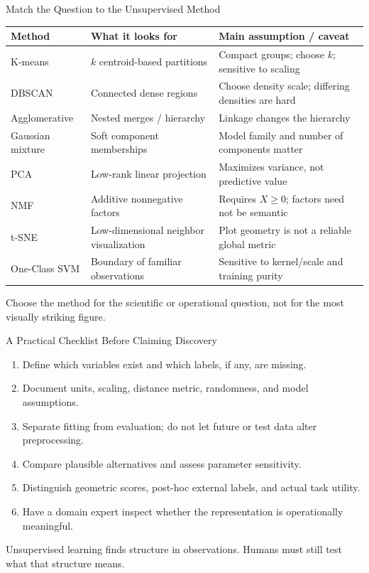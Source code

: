 \documentclass[aspectratio=169,10pt]{beamer}
\begin{document}
\begin{frame}{Match the Question to the Unsupervised Method}
\footnotesize
\begin{tabular}{@{}p{.22\linewidth}p{.31\linewidth}p{.39\linewidth}@{}}
\textbf{Method} & \textbf{What it looks for} & \textbf{Main assumption / caveat}\\[2pt]\hline
K-means & $k$ centroid-based partitions & Compact groups; choose $k$; sensitive to scaling\\[2pt]
DBSCAN & Connected dense regions & Choose density scale; differing densities are hard\\[2pt]
Agglomerative & Nested merges / hierarchy & Linkage changes the hierarchy\\[2pt]
Gaussian mixture & Soft component memberships & Model family and number of components matter\\[2pt]
PCA & Low-rank linear projection & Maximizes variance, not predictive value\\[2pt]
NMF & Additive nonnegative factors & Requires $X\ge0$; factors need not be semantic\\[2pt]
t-SNE & Low-dimensional neighbor visualization & Plot geometry is not a reliable global metric\\[2pt]
One-Class SVM & Boundary of familiar observations & Sensitive to kernel/scale and training purity
\end{tabular}
\vspace{1pt}
\begin{keyidea}Choose the method for the scientific or operational question, not for the most visually striking figure.\end{keyidea}
\end{frame}

\begin{frame}{A Practical Checklist Before Claiming Discovery}
\small
\begin{enumerate}
\item Define which variables exist and which labels, if any, are missing.
\item Document units, scaling, distance metric, randomness, and model assumptions.
\item Separate fitting from evaluation; do not let future or test data alter preprocessing.
\item Compare plausible alternatives and assess parameter sensitivity.
\item Distinguish geometric scores, post-hoc external labels, and actual task utility.
\item Have a domain expert inspect whether the representation is operationally meaningful.
\end{enumerate}
\begin{keyidea}Unsupervised learning finds structure in observations. Humans must still test what that structure means.\end{keyidea}
\end{frame}
\end{document}
